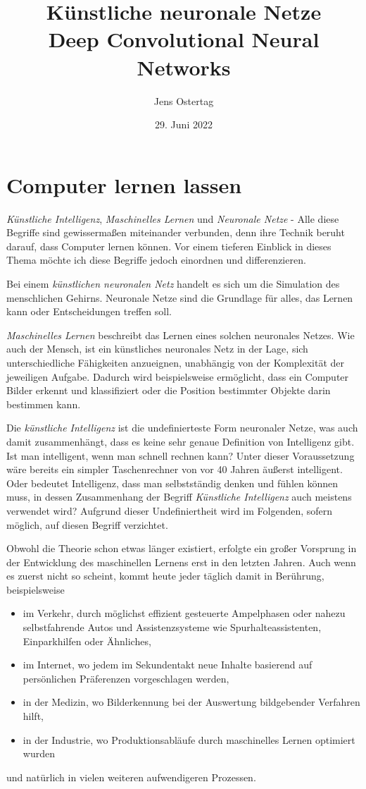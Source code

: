 \documentclass[12pt,a4]{article}
\title{\textbf{Künstliche neuronale Netze\\Deep Convolutional Neural Networks}}
\author{Jens Ostertag}
\date{29. Juni 2022}
\begin{document}
\maketitle
\tableofcontents
\clearpage
\section{Computer lernen lassen}\label{sec:Introduction}
\textit{Künstliche Intelligenz}, \textit{Maschinelles Lernen} und \textit{Neuronale Netze} - Alle diese Begriffe sind gewissermaßen miteinander verbunden, denn ihre Technik beruht darauf, dass Computer lernen können. Vor einem tieferen Einblick in dieses Thema möchte ich diese Begriffe jedoch einordnen und differenzieren.

Bei einem \textit{künstlichen neuronalen Netz} handelt es sich um die Simulation des menschlichen Gehirns. Neuronale Netze sind die Grundlage für alles, das Lernen kann oder Entscheidungen treffen soll.

\textit{Maschinelles Lernen} beschreibt das Lernen eines solchen neuronales Netzes. Wie auch der Mensch, ist ein künstliches neuronales Netz in der Lage, sich unterschiedliche Fähigkeiten anzueignen, unabhängig von der Komplexität der jeweiligen Aufgabe. Dadurch wird beispielsweise ermöglicht, dass ein Computer Bilder erkennt und klassifiziert oder die Position bestimmter Objekte darin bestimmen kann.

Die \textit{künstliche Intelligenz} ist die undefinierteste Form neuronaler Netze, was auch damit zusammenhängt, dass es keine sehr genaue Definition von Intelligenz gibt. Ist man intelligent, wenn man schnell rechnen kann? Unter dieser Voraussetzung wäre bereits ein simpler Taschenrechner von vor 40 Jahren äußerst intelligent. Oder bedeutet Intelligenz, dass man selbstständig denken und fühlen können muss, in dessen Zusammenhang der Begriff \textit{Künstliche Intelligenz} auch meistens verwendet wird?
Aufgrund dieser Undefiniertheit wird im Folgenden, sofern möglich, auf diesen Begriff verzichtet.

Obwohl die Theorie schon etwas länger existiert, erfolgte ein großer Vorsprung in der Entwicklung des maschinellen Lernens erst in den letzten Jahren. Auch wenn es zuerst nicht so scheint, kommt heute jeder täglich damit in Berührung, beispielsweise
\begin{itemize}
\item im Verkehr, durch möglichst effizient gesteuerte Ampelphasen oder nahezu selbstfahrende Autos und Assistenzsysteme wie Spurhalteassistenten, Einparkhilfen oder Ähnliches,
\item im Internet, wo jedem im Sekundentakt neue Inhalte basierend auf persönlichen Präferenzen vorgeschlagen werden,
\item in der Medizin, wo Bilderkennung bei der Auswertung bildgebender Verfahren hilft,
\item in der Industrie, wo Produktionsabläufe durch maschinelles Lernen optimiert wurden
\end{itemize}
und natürlich in vielen weiteren aufwendigeren Prozessen.
\end{document}
